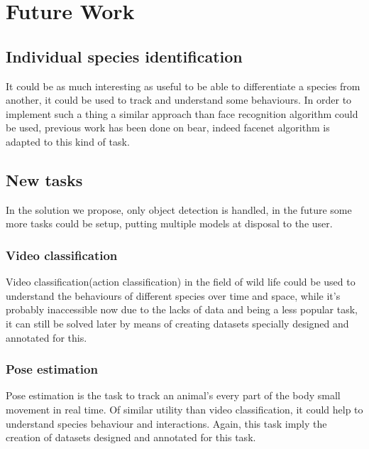 \chapter{Future Work}
\section{Individual species identification}
It could be as much interesting as useful to be able to differentiate a species from another, it could be used to track and understand some behaviours.
In order to implement such a thing a similar approach than face recognition algorithm could be used, previous work has been done on bear\cite{bearfacenet}, indeed facenet\cite{facenetoriginal} algorithm is adapted to this kind of task.

\section{New tasks}

In the solution we propose, only object detection is handled, in the future some more tasks could be setup, putting multiple models at disposal to the user.

\subsection{Video classification}
Video classification(action classification) in the field of wild life could be used to understand the behaviours of different species over time and space, while it's probably inaccessible now due to the lacks of data and being a less popular task, it can still be solved later by means of creating datasets specially designed and annotated for this.

\subsection{Pose estimation}
Pose estimation is the task to track an animal's every part of the body small movement in real time.
Of similar utility than video classification, it could help to understand species behaviour and interactions.
Again, this task imply the creation of datasets designed and annotated for this task.